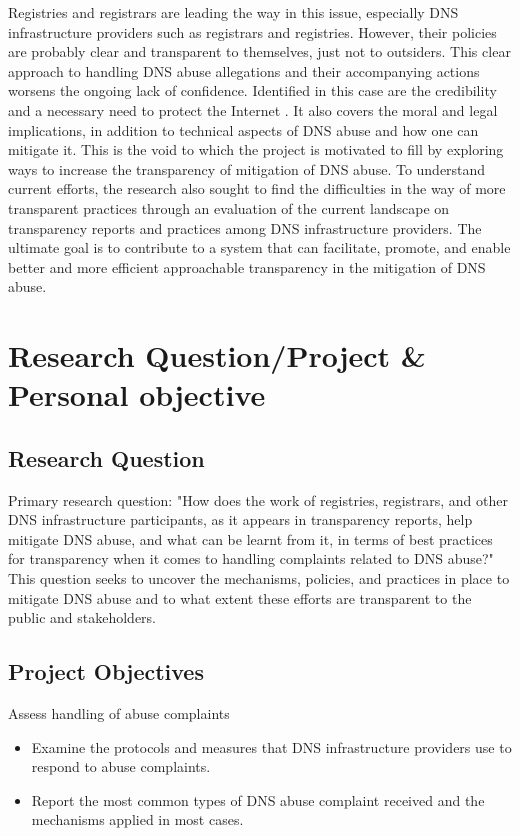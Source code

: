 Registries and registrars are leading the way in this issue, especially DNS infrastructure providers such as registrars and registries. However, their policies are probably clear and transparent to themselves, just not to outsiders.  This clear approach to handling DNS abuse allegations and their accompanying actions worsens the ongoing lack of confidence. Identified in this case are the credibility and a necessary need to protect the Internet \cite{cerf2022}. It also covers the moral and legal implications, in addition to technical aspects of DNS abuse and how one can mitigate it. This is the void to which the project is motivated to fill by exploring ways to increase the transparency of mitigation of DNS abuse. To understand current efforts, the research also sought to find the difficulties in the way of more transparent practices through an evaluation of the current landscape on transparency reports and practices among DNS infrastructure providers. The ultimate goal is to contribute to a system that can facilitate, promote, and enable better and more efficient approachable transparency in the mitigation of DNS abuse.


\section{Research Question/Project \& Personal objective} 
\subsection{Research Question}

Primary research question: "How does the work of registries, registrars, and other DNS infrastructure participants, as it appears in transparency reports, help mitigate DNS abuse, and what can be learnt from it, in terms of best practices for transparency when it comes to handling complaints related to DNS abuse?" This question seeks to uncover the mechanisms, policies, and practices in place to mitigate DNS abuse and to what extent these efforts are transparent to the public and stakeholders.

\subsection{Project Objectives}

Assess handling of abuse complaints

\begin{itemize}
  \item Examine the protocols and measures that DNS infrastructure providers use to respond to abuse complaints.
  \item Report the most common types of DNS abuse complaint received and the mechanisms applied in most cases.
\end{itemize}

